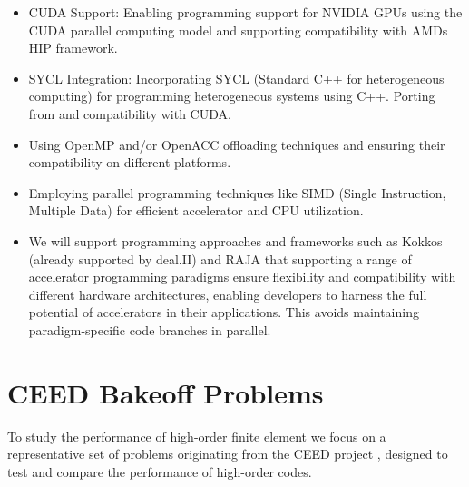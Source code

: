 \documentclass[a4paper,12pt]{article}
\begin{document}
\begin{itemize}
\item CUDA Support: Enabling programming support for NVIDIA GPUs using the CUDA parallel computing model and
supporting compatibility with AMDs HIP framework.
\item SYCL Integration: Incorporating SYCL (Standard C++ for heterogeneous computing) for programming heterogeneous
systems using C++. Porting from and compatibility with CUDA.
\item Using OpenMP and/or OpenACC offloading techniques and ensuring their compatibility on different
platforms.
\item Employing parallel programming techniques like SIMD (Single Instruction, Multiple Data) for efficient accelerator
and CPU utilization.
\item We will support programming approaches and frameworks such as Kokkos (already supported by deal.II) and RAJA
that supporting a range of accelerator programming paradigms ensure flexibility and compatibility with different
hardware architectures, enabling developers to harness the full potential of accelerators in their applications. This avoids maintaining paradigm-specific code branches in parallel.
\end{itemize}

\newpage

\section{CEED Bakeoff Problems}

To study the performance of high-order finite element we focus on a representative
set of problems originating from the CEED project \cite{}, designed to test and compare
the performance of high-order codes.
\end{document}
